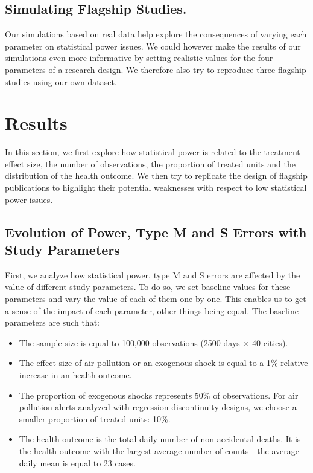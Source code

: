 \documentclass[12pt]{article}
\begin{document}
        \subsection{Simulating Flagship Studies.} Our simulations based on real data help explore the consequences of varying each parameter on statistical power issues. We could however make the results of our simulations even more informative by setting realistic values for the four parameters of a research design. We therefore also try to reproduce three flagship studies using our own dataset.
        




\section{Results}

In this section, we first explore how statistical power is related to the treatment effect size, the number of observations, the proportion of treated units and the distribution of the health outcome. We then try to replicate the design of flagship publications to highlight their potential weaknesses with respect to low statistical power issues. 

    \subsection{Evolution of Power, Type M and S Errors with Study Parameters}

            First, we analyze how statistical power, type M and S errors are affected by the value of different study parameters. To do so, we set baseline values for these parameters and vary the value of each of them one by one. This enables us to get a sense of the impact of each parameter, other things being equal. The baseline parameters are such that:
            
            \begin{itemize}
                \item The sample size is equal to 100,000 observations (2500 days $\times$ 40 cities).
                \item The effect size of air pollution or an exogenous shock is equal to a 1\% relative increase in an health outcome.
                \item The proportion of exogenous shocks represents 50\% of observations. For air pollution alerts analyzed with regression discontinuity designs, we choose a smaller proportion of treated units: 10\%.
                \item The health outcome is the total daily number of non-accidental deaths. It is the health outcome with the largest average number of counts---the average daily mean is equal to 23 cases.
            \end{itemize}
            
\end{document}
